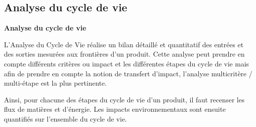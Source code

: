 \documentclass[11pt,oneside]{article}
\begin{document}
\subsection{Analyse du cycle de vie}
\begin{defi}
\textbf{Analyse du cycle de vie}

L'Analyse du Cycle de Vie réalise un bilan détaillé et quantitatif des entrées et des sorties mesurées aux frontières d'un produit. Cette analyse peut prendre en compte différents critères ou impact et les différentes étapes du cycle de vie mais afin de prendre en compte la notion de transfert d’impact, l’analyse multicritère / multi-étape est la plus pertinente.

Ainsi, pour chacune des étapes du cycle de vie d'un produit, il faut recenser les flux de matières et d'énergie. Les impacts environnementaux sont ensuite quantifiés sur l’ensemble du cycle de vie. 
\end{defi}
\end{document}
